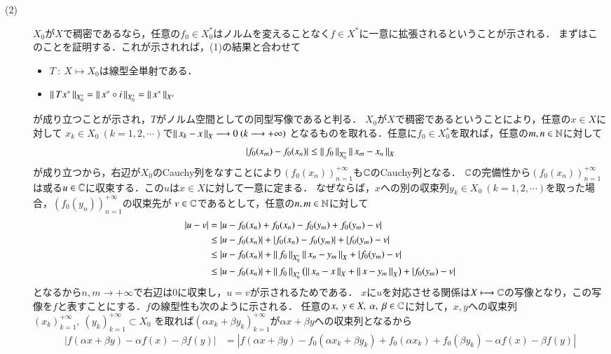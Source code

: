 \begin{prf}
\begin{description}
	\item[(2)] $X_0$が$X$で稠密であるなら，任意の$f_0 \in X_0^*$はノルムを変えることなく$f \in X^*$に一意に拡張されるということが示される．
		まずはこのことを証明する．これが示されれば，(1)の結果と合わせて
		\begin{itemize}
			\item $T\ :\ X \longmapsto X_0$は線型全単射である．
			\item $\left\|\, T x^*\, \right\|_{X_0^*} = \left\|\, x^* \circ i\, \right\|_{X_0^*} = \left\|\, x^*\, \right\|_{X^*}$
		\end{itemize}
		が成り立つことが示され，$T$がノルム空間としての同型写像であると判る．
		$X_0$が$X$で稠密であるということにより，任意の$x \in X$に対して
		$x_k \in X_0 \ (k=1,2,\cdots)$で$\left\|\, x_k - x\, \right\|_{X} \longrightarrow 0\ (k \longrightarrow +\infty)$
		となるものを取れる．任意に$f_0 \in X_0^*$を取れば，任意の$m,n \in \mathbb{N}$に対して
		\begin{align}
			|f_0(x_m) - f_0(x_n)| \leq \left\|\, f_0\, \right\|_{X_0^*} \left\|\, x_m - x_n\, \right\|_{X}
		\end{align}
		が成り立つから，右辺が$X_0$のCauchy列をなすことにより$(f_0(x_n))_{n=1}^{+\infty}$も$\mathbb{C}$のCauchy列となる．
		$\mathbb{C}$の完備性から$(f_0(x_n))_{n=1}^{+\infty}$は或る$u \in \mathbb{C}$に収束する．この$u$は$x \in X$に対して一意に定まる．
		なぜならば，$x$への別の収束列$y_k \in X_0 \ (k=1,2,\cdots)$を取った場合，$(f_0(y_n))_{n=1}^{+\infty}$の収束先が
		$v \in \mathbb{C}$であるとして，任意の$n,m \in \mathbb{N}$に対して
		\begin{align}
			|u - v| &= |u - f_0(x_n) + f_0(x_n) - f_0(y_m) + f_0(y_m) - v| \\
			&\leq |u - f_0(x_n)| + |f_0(x_n) - f_0(y_m)| + |f_0(y_m) - v| \\
			&\leq |u - f_0(x_n)| + \left\|\, f_0\, \right\|_{X_0^*}\left\|\, x_n - y_m\, \right\|_{X} + |f_0(y_m) - v| \\
			&\leq |u - f_0(x_n)| + \left\|\, f_0\, \right\|_{X_0^*}\left(\left\|\, x_n - x\, \right\|_{X} + \left\|\, x - y_m\, \right\|_{X}\right)+ |f_0(y_m) - v|
		\end{align}
		となるから$n,m \longrightarrow +\infty$で右辺は0に収束し，$u = v$が示されるためである．
		$x$に$u$を対応させる関係は$X \longmapsto \mathbb{C}$の写像となり，この写像を$f$と表すことにする．$f$の線型性も次のように示される．
		任意の$x,\ y \in X,\ \alpha,\ \beta \in \mathbb{C}$に対して，$x,y$への収束列$(x_k)_{k=1}^{+\infty},\ (y_k)_{k=1}^{+\infty} \subset X_0$
		を取れば$(\alpha x_k + \beta y_k)_{k=1}^{+\infty}$が$\alpha x+ \beta y$への収束列となるから
		\begin{align}
			|f(\alpha x + \beta y) - \alpha f(x) - \beta f(y)| 
			&= |f(\alpha x + \beta y) - f_0(\alpha x_k + \beta y_k) + f_0(\alpha x_k) + f_0(\beta y_k) - \alpha f(x) - \beta f(y)| \\

\end{align}
\end{description}
\end{prf}
